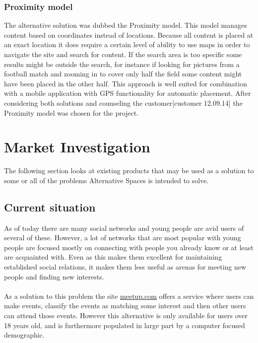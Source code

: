 \subsubsection{Proximity model}
The alternative solution was dubbed the Proximity model. This model manages content based on coordinates instead of locations. Because all content is placed at an exact location it does require a certain level of ability to use maps in order to navigate the site and search for content. If the search area is too specific some results might be outside the search, for instance if looking for pictures from a football match and zooming in to cover only half the field some content might have been placed in the other half. This approach is well suited for combination with a mobile application with GPS functionality for automatic placement. After considering both solutions and counseling the customer[customer 12.09.14] the Proximity model was chosen for the project.

\section{Market Investigation}
\label{sec:PrelimMarket}

The following section looks at existing products that may be used as a solution to some or all of the problems Alternative Spaces is intended to solve.

\subsection{Current situation}
\label{subsec:PrelimMarketSituation}
As of today there are many social networks and young people are avid users of several of these. However, a lot of networks that are most popular with young people are focused mostly on connecting with people you already know or at least are acquainted with. Even as this makes them excellent for maintaining established social relations, it makes them less useful as arenas for meeting new people and finding new interests.

\paragraph{} As a solution to this problem the site \href{http://www.meetup.com}{meetup.com} offers a service where users can make events, classify the events as matching some interest and then other users can attend those events. However this alternative is only available for users over 18 years old, and is furthermore populated in large part by a computer focused demographic.

